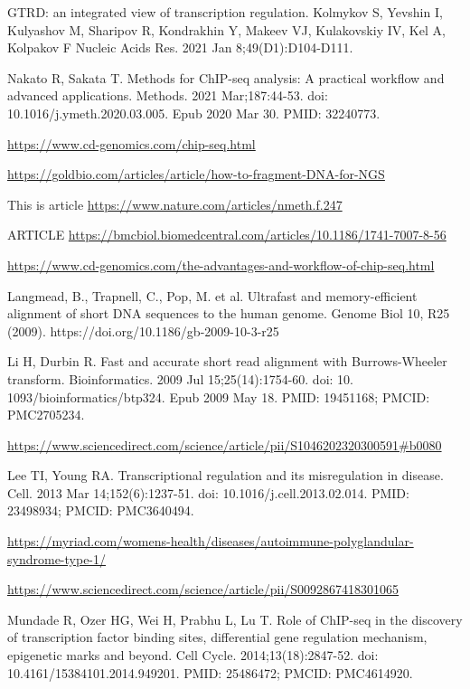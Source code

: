 \documentclass[12pt]{article}
\begin{document}

\begin{thebibliography}{99}

 GTRD: an integrated view of transcription regulation.
Kolmykov S, Yevshin I, Kulyashov M, Sharipov R, Kondrakhin Y, Makeev VJ,
Kulakovskiy IV, Kel A, Kolpakov F Nucleic Acids Res. 2021 Jan
8;49(D1):D104-D111.

 Nakato R, Sakata T. Methods for ChIP-seq analysis: A
practical workflow and advanced applications. Methods. 2021 Mar;187:44-53.
doi: 10.1016/j.ymeth.2020.03.005. Epub 2020 Mar 30. PMID: 32240773.

 \url{https://www.cd-genomics.com/chip-seq.html}

\url{https://goldbio.com/articles/article/how-to-fragment-DNA-for-NGS}

 This is article
\url{https://www.nature.com/articles/nmeth.f.247}

 ARTICLE
\url{https://bmcbiol.biomedcentral.com/articles/10.1186/1741-7007-8-56}

 \url{https://www.cd-genomics.com/the-advantages-and-workflow-of-chip-seq.html}

 Langmead, B., Trapnell, C., Pop, M. et al. Ultrafast and
memory-efficient alignment of short DNA sequences to the human genome. Genome
Biol 10, R25 (2009). https://doi.org/10.1186/gb-2009-10-3-r25

 Li H, Durbin R. Fast and accurate short read alignment with
Burrows-Wheeler transform. Bioinformatics. 2009 Jul 15;25(14):1754-60. doi: 10.
1093/bioinformatics/btp324. Epub 2009 May 18. PMID: 19451168; PMCID: PMC2705234.

 \url{https://www.sciencedirect.com/science/article/pii/S1046202320300591#b0080}

 Lee TI, Young RA. Transcriptional regulation and its
misregulation in disease. Cell. 2013 Mar 14;152(6):1237-51.
doi: 10.1016/j.cell.2013.02.014. PMID: 23498934; PMCID: PMC3640494.

 \url{https://myriad.com/womens-health/diseases/autoimmune-polyglandular-syndrome-type-1/}

 \url{https://www.sciencedirect.com/science/article/pii/S0092867418301065}

 Mundade R, Ozer HG, Wei H, Prabhu L, Lu T. Role of ChIP-seq
in the discovery of transcription factor binding sites, differential gene
regulation mechanism, epigenetic marks and beyond. Cell Cycle.
2014;13(18):2847-52. doi: 10.4161/15384101.2014.949201. PMID: 25486472;
PMCID: PMC4614920.


\end{thebibliography}
\end{document}
